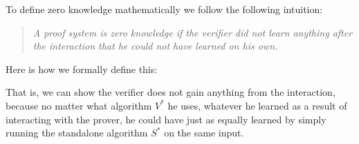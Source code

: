 To define zero knowledge mathematically we follow the following
intuition:

\begin{quote}
\emph{A proof system is zero knowledge if the verifier did not learn
anything after the interaction that he could not have learned on his
own.}
\end{quote}

Here is how we formally define this:

\hypertarget{zkpdef}{}

That is, we can show the verifier does not gain anything from the
interaction, because no matter what algorithm \(V^*\) he uses, whatever
he learned as a result of interacting with the prover, he could have
just as equally learned by simply running the standalone algorithm
\(S^*\) on the same input.


